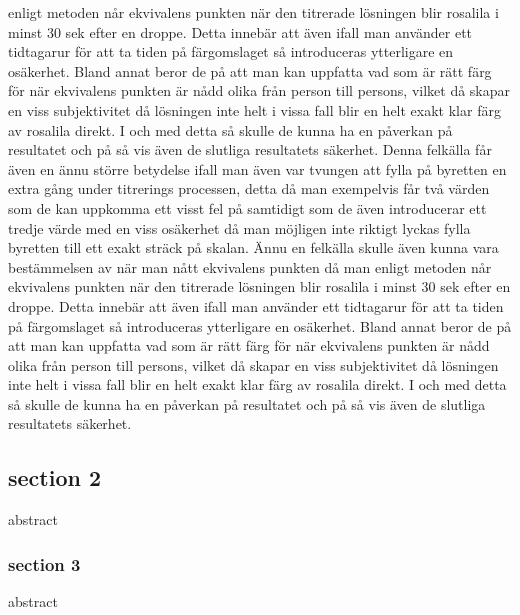 enligt metoden når ekvivalens punkten när den titrerade lösningen blir rosalila i minst 30 sek efter en
droppe. Detta innebär att även ifall man använder ett tidtagarur för att ta tiden på färgomslaget så
introduceras ytterligare en osäkerhet. Bland annat beror de på att man kan uppfatta vad som är rätt
färg för när ekvivalens punkten är nådd olika från person till persons, vilket då skapar en viss
subjektivitet då lösningen inte helt i vissa fall blir en helt exakt klar färg av rosalila direkt. I och med
detta så skulle de kunna ha en påverkan på resultatet och på så vis även de slutliga
resultatets säkerhet. Denna felkälla får även en ännu större betydelse ifall man även var tvungen att fylla på
byretten en extra gång under titrerings processen, detta då man exempelvis får två värden som de kan
uppkomma ett visst fel på samtidigt som de även introducerar ett tredje värde med en viss osäkerhet
då man möjligen inte riktigt lyckas fylla byretten till ett exakt sträck på skalan.
Ännu en felkälla skulle även kunna vara bestämmelsen av när man nått ekvivalens punkten då man
enligt metoden når ekvivalens punkten när den titrerade lösningen blir rosalila i minst 30 sek efter en
droppe. Detta innebär att även ifall man använder ett tidtagarur för att ta tiden på färgomslaget så
introduceras ytterligare en osäkerhet. Bland annat beror de på att man kan uppfatta vad som är rätt
färg för när ekvivalens punkten är nådd olika från person till persons, vilket då skapar en viss
subjektivitet då lösningen inte helt i vissa fall blir en helt exakt klar färg av rosalila direkt. I och med
detta så skulle de kunna ha en påverkan på resultatet och på så vis även de slutliga
resultatets säkerhet. 

\subsection{section 2}
abstract
\subsubsection{section 3}
abstract